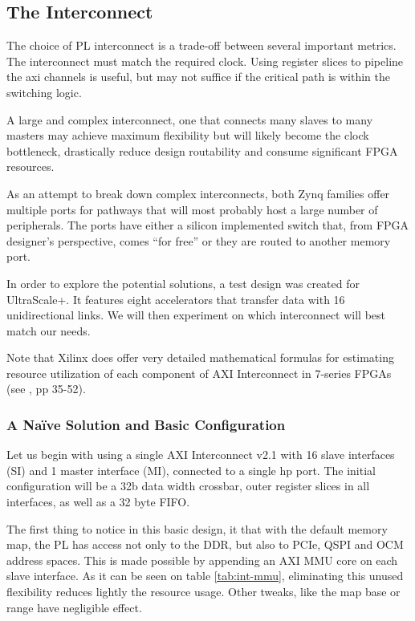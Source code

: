 \subsection{The Interconnect}

The choice of PL interconnect is a trade-off between several important metrics.
The interconnect must match the required clock. 
Using register slices to pipeline the \gls{axi} channels is useful, 
but may not suffice if the critical path is within the switching logic.

A large and complex interconnect, one that connects many slaves to many masters
may achieve maximum flexibility but will likely become the clock bottleneck,
drastically reduce design routability and consume significant FPGA resources.

As an attempt to break down complex interconnects, both Zynq families
offer multiple ports for pathways that will most 
probably host a large number of peripherals.
The ports have either a silicon implemented switch that,
from FPGA designer's perspective, comes ``for free'' or they are routed to
another memory port. 

In order to explore the potential solutions, a test design was created for UltraScale+. 
It features eight accelerators that transfer data with 16 unidirectional links. 
We will then experiment on which interconnect will best match our needs.

Note that Xilinx does offer very detailed mathematical formulas 
for estimating resource utilization of each component of AXI Interconnect 
in 7-series FPGAs (see \cite{pg059}, pp 35-52).

\subsubsection{A Naïve Solution and Basic Configuration}

Let us begin with using a single AXI Interconnect v2.1
with 16 slave interfaces (SI) and 1 master interface (MI), 
connected to a single \gls{hp} port. The initial configuration
will be a 32b data width crossbar, outer register slices in all interfaces,
as well as a 32 byte FIFO.

The first thing to notice in this basic design,
it that with the default memory map, the PL has access not only to the DDR,
but also to PCIe, QSPI and OCM address spaces. 
This is made possible by appending an AXI MMU core on each slave interface.
As it can be seen on table \ref{tab:int-mmu}, eliminating this unused flexibility
reduces lightly the resource usage. Other tweaks, like the map base or range
have negligible effect.

